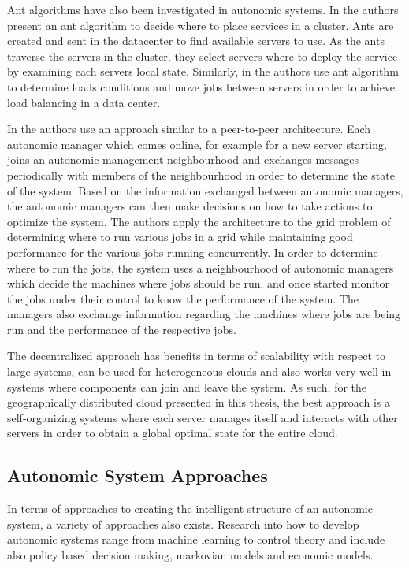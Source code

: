 Ant algorithms have also been investigated in autonomic systems. In \cite{statmechcomplexnetwork} the authors present an ant algorithm to decide where to place services in a cluster. Ants are created and sent in the datacenter to find available servers to use. As the ants traverse the servers in the cluster, they select servers where to deploy the service by examining each servers local state. Similarly, in \cite{messor:loadbalaneants} the authors use ant algorithm to determine loads conditions and move jobs between servers in order to achieve load balancing in a data center.

In \cite{decentralized1} the authors use an approach similar to a peer-to-peer architecture. Each autonomic manager which comes online, for example for a new server starting, joins an autonomic management neighbourhood and exchanges messages periodically with members of the neighbourhood in order to determine the state of the system. Based on the information exchanged between autonomic managers, the autonomic managers can then make decisions on how to take actions to optimize the system. The authors apply the architecture to the grid problem of determining where to run various jobs in a grid while maintaining good performance for the various jobs running concurrently. In order to determine where to run the jobs, the system uses a neighbourhood of autonomic managers which decide the machines where jobs should be run, and once started monitor the jobs under their control to know the performance of the system. The managers also exchange information regarding the machines where jobs are being run and the performance of the respective jobs.

The decentralized approach has benefits in terms of scalability with respect to large systems, can be used for heterogeneous clouds and also works very well in systems where components can join and leave the system. As such, for the geographically distributed cloud presented in this thesis, the best approach is a self-organizing systems where each server manages itself and interacts with other servers in order to obtain a global optimal state for the entire cloud.

\subsection{Autonomic System Approaches}

In terms of approaches to creating the intelligent structure of an autonomic system, a variety of approaches also exists. Research into how to develop autonomic systems range from machine learning to control theory and include also policy based decision making, markovian models and economic models.


